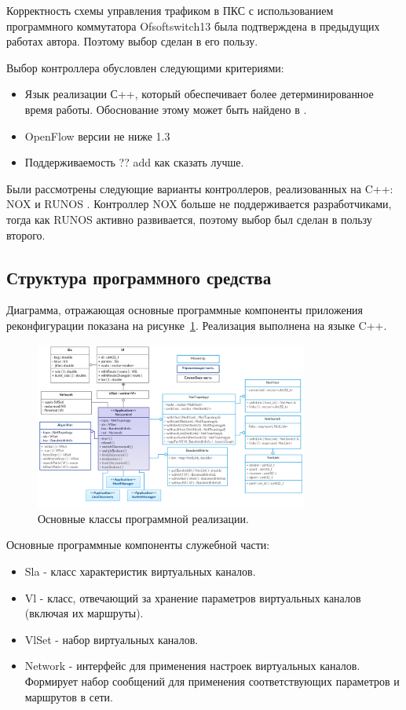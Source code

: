 \documentclass[12pt, a4paper]{article}
\begin{document}
Корректность схемы управления трафиком в ПКС с использованием программного коммутатора Ofsoftswitch13 \cite{ofsoftswitch} была подтверждена в предыдущих работах автора. Поэтому выбор сделан в его пользу.

Выбор контроллера обусловлен следующими критериями:
\begin{itemize}
	\item Язык реализации С++, который обеспечивает более детерминированное время работы. Обоснование этому может быть найдено в \cite{cpp}.
	\item OpenFlow версии не ниже 1.3
	\item Поддерживаемость ?? add как сказать лучше.
\end{itemize}

Были рассмотрены следующие варианты контроллеров, реализованных на C++: NOX \cite{nox} и RUNOS \cite{runos}. Контроллер NOX больше не поддерживается разработчиками, тогда как RUNOS активно развивается, поэтому выбор был сделан в пользу второго.

\subsection{Структура программного средства}
Диаграмма, отражающая основные программные компоненты приложения реконфигурации показана на рисунке~\ref{pic:classes}. Реализация выполнена на языке C++.

\begin{figure}[h!]
	\centering
	\includegraphics[width=0.80\textwidth]{img/classes.png}
	\caption{Основные классы программной реализации.}
	\label{pic:classes}
\end{figure}


Основные программные компоненты служебной части:
\begin{itemize}
	\item Sla - класс характеристик виртуальных каналов.
	\item Vl - класс, отвечающий за хранение параметров виртуальных каналов (включая их маршруты).
	\item VlSet - набор виртуальных каналов.
	\item Network - интерфейс для применения настроек виртуальных каналов. Формирует набор сообщений для применения соответствующих параметров и маршрутов в сети.
\end{itemize}
\end{document}
